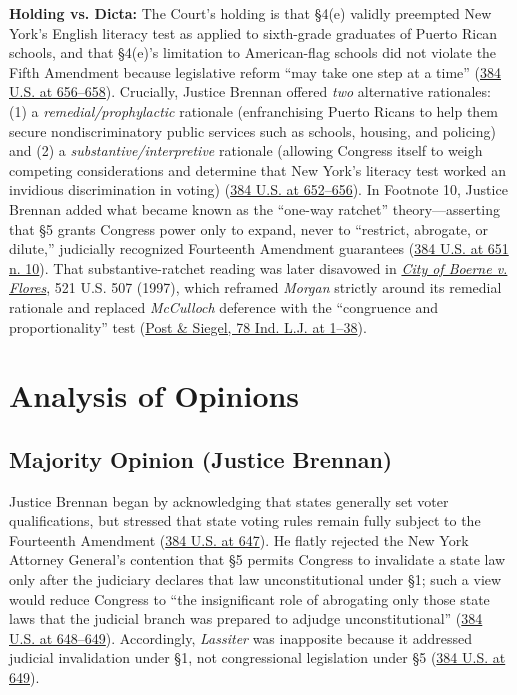 \documentclass[12pt]{article}
\begin{document}
\textbf{Holding vs. Dicta:} The Court's holding is that \S 4(e) validly preempted New York's English literacy test as applied to sixth-grade graduates of Puerto Rican schools, and that \S 4(e)'s limitation to American-flag schools did not violate the Fifth Amendment because legislative reform ``may take one step at a time'' (\href{https://supreme.justia.com/cases/federal/us/384/641/}{384 U.S. at 656--658}). Crucially, Justice Brennan offered \textit{two} alternative rationales: (1) a \textit{remedial/prophylactic} rationale (enfranchising Puerto Ricans to help them secure nondiscriminatory public services such as schools, housing, and policing) and (2) a \textit{substantive/interpretive} rationale (allowing Congress itself to weigh competing considerations and determine that New York's literacy test worked an invidious discrimination in voting) (\href{https://supreme.justia.com/cases/federal/us/384/641/}{384 U.S. at 652--656}). In Footnote 10, Justice Brennan added what became known as the ``one-way ratchet'' theory---asserting that \S 5 grants Congress power only to expand, never to ``restrict, abrogate, or dilute,'' judicially recognized Fourteenth Amendment guarantees (\href{https://supreme.justia.com/cases/federal/us/384/641/}{384 U.S. at 651 n. 10}). That substantive-ratchet reading was later disavowed in \href{https://supreme.justia.com/cases/federal/us/521/507/}{\textit{City of Boerne v. Flores}}, 521 U.S. 507 (1997), which reframed \textit{Morgan} strictly around its remedial rationale and replaced \textit{McCulloch} deference with the ``congruence and proportionality'' test (\href{https://law.yale.edu/sites/default/files/documents/pdf/Faculty/Siegel_ProtectingTheConstitutionFromThePeople.pdf}{Post \& Siegel, 78 Ind. L.J. at 1--38}).

\section{Analysis of Opinions}

\subsection{Majority Opinion (Justice Brennan)}

Justice Brennan began by acknowledging that states generally set voter qualifications, but stressed that state voting rules remain fully subject to the Fourteenth Amendment (\href{https://supreme.justia.com/cases/federal/us/384/641/}{384 U.S. at 647}). He flatly rejected the New York Attorney General's contention that \S 5 permits Congress to invalidate a state law only after the judiciary declares that law unconstitutional under \S 1; such a view would reduce Congress to ``the insignificant role of abrogating only those state laws that the judicial branch was prepared to adjudge unconstitutional'' (\href{https://supreme.justia.com/cases/federal/us/384/641/}{384 U.S. at 648--649}). Accordingly, \textit{Lassiter} was inapposite because it addressed judicial invalidation under \S 1, not congressional legislation under \S 5 (\href{https://supreme.justia.com/cases/federal/us/384/641/}{384 U.S. at 649}).
\end{document}
